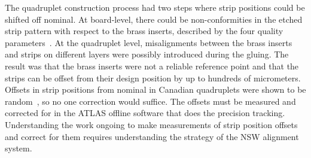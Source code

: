 
The quadruplet construction process had two steps where strip positions could be shifted off nominal. At board-level, there could be non-conformities in the etched strip pattern with respect to the brass inserts, described by the four quality parameters~\cite{carlson_results_2019}. At the quadruplet level, misalignments between the brass inserts and strips on different layers were possibly introduced during the gluing. The result was that the brass inserts were not a reliable reference point and that the strips can be offset from their design position by up to hundreds of micrometers. Offsets in strip positions from nominal in Canadian quadruplets were shown to be random~\cite{carlson_results_2019}, so no one correction would suffice. The offsets must be measured and corrected for in the ATLAS offline software that does the precision tracking. Understanding the work ongoing to make measurements of strip position offsets and correct for them requires understanding the strategy of the NSW alignment system.



